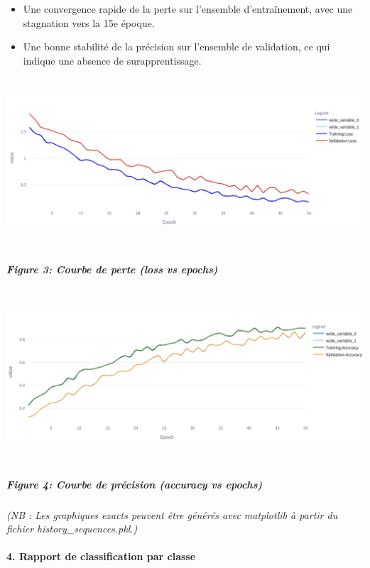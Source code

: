 \documentclass[
]{article}
\begin{document}
\begin{itemize}
\item
  Une convergence rapide de la perte sur l'ensemble d'entraînement, avec une stagnation vers la 15e époque.
\item
  Une bonne stabilité de la précision sur l'ensemble de validation, ce qui indique une absence de surapprentissage.
\end{itemize}

\includegraphics[width=6.5in,height=2.45833in]{c70417d1-281e-4e06-a2de-40679a02e3f7_media/media/image3.png}

\hypertarget{figure-3-courbe-de-perte-loss-vs-epochs}{%
\subparagraph{Figure 3: Courbe de perte (loss vs epochs)}\label{figure-3-courbe-de-perte-loss-vs-epochs}}

\includegraphics[width=6.5in,height=2.45833in]{c70417d1-281e-4e06-a2de-40679a02e3f7_media/media/image4.png}

\hypertarget{figure-4-courbe-de-pruxe9cision-accuracy-vs-epochs}{%
\subparagraph{Figure 4: Courbe de précision (accuracy vs epochs)}\label{figure-4-courbe-de-pruxe9cision-accuracy-vs-epochs}}

\emph{(NB : Les graphiques exacts peuvent être générés avec matplotlib à partir du fichier history\_sequences.pkl.)}

\hypertarget{rapport-de-classification-par-classe}{%
\paragraph{\texorpdfstring{\textbf{4. Rapport de classification par classe}}{4. Rapport de classification par classe}}\label{rapport-de-classification-par-classe}}
\end{document}
